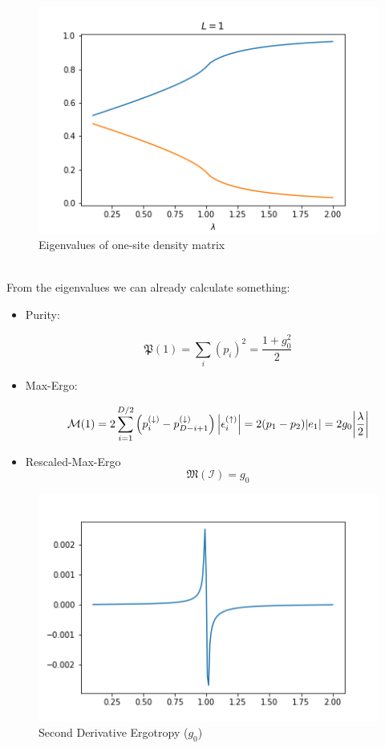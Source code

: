\documentclass[10pt,a4paper]{article}
\begin{document}
\begin{figure}[h!]
	\centering
	\includegraphics[width=0.7\linewidth]{L1_lambda}
	\caption{Eigenvalues of one-site density matrix}
	\label{fig:l1lambda}
\end{figure}\\
From the eigenvalues we can already calculate something:
\begin{itemize}
	\item Purity: 

	\begin{equation}
		\mathfrak{P}(1)=\sum_{i}\left(p_{i}\right)^{2}=\frac{1+g_0^2}{2}
	\end{equation}
	\item Max-Ergo:
	
	\begin{equation}
			\mathcal{M}(1)=2 \sum_{i=1}^{D / 2}\left(p_{i}^{(\downarrow)}-p_{D-i+1}^{(\downarrow)}\right)\left|\epsilon_{i}^{(\uparrow)}\right|=2(p_1-p_2)\abs{e_1}=2g_0\abs{\frac{\lambda}{2}}
	\end{equation}
	\item Rescaled-Max-Ergo
	\begin{equation}
	\mathfrak{M}(\mathcal{I})=g_0
	\end{equation}	
	
\end{itemize}
\begin{figure}[h]
	\centering
	\includegraphics[width=0.7\linewidth]{one_site_secdev}
	\caption{Second Derivative Ergotropy ($g_0$)}
	\label{fig:onesitesecdev}
\end{figure}
\end{document}
